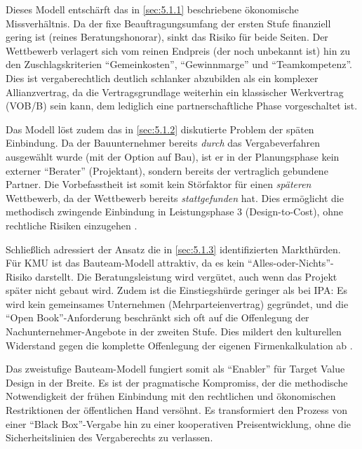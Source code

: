 Dieses Modell entschärft das in \cref{sec:5.1.1} beschriebene ökonomische Missverhältnis. Da der fixe Beauftragungsumfang der ersten Stufe finanziell gering ist (reines Beratungshonorar), sinkt das Risiko für beide Seiten. Der Wettbewerb verlagert sich vom reinen Endpreis (der noch unbekannt ist) hin zu den Zuschlagskriterien \enquote{Gemeinkosten}, \enquote{Gewinnmarge} und \enquote{Teamkompetenz}. Dies ist vergaberechtlich deutlich schlanker abzubilden als ein komplexer Allianzvertrag, da die Vertragsgrundlage weiterhin ein klassischer Werkvertrag (\acs{VOB}/B) sein kann, dem lediglich eine partnerschaftliche Phase vorgeschaltet ist.

Das Modell löst zudem das in \cref{sec:5.1.2} diskutierte Problem der späten Einbindung. Da der Bauunternehmer bereits \textit{durch} das Vergabeverfahren ausgewählt wurde (mit der Option auf Bau), ist er in der Planungsphase kein externer \enquote{Berater} (Projektant), sondern bereits der vertraglich gebundene Partner. Die Vorbefasstheit ist somit kein Störfaktor für einen \textit{späteren} Wettbewerb, da der Wettbewerb bereits \textit{stattgefunden} hat. Dies ermöglicht die methodisch zwingende Einbindung in Leistungsphase 3 (Design-to-Cost), ohne rechtliche Risiken einzugehen \autocite[Vgl.][]{greb_projektantenproblematik_2024}.

Schließlich adressiert der Ansatz die in \cref{sec:5.1.3} identifizierten Markthürden. Für \acs{KMU} ist das Bauteam-Modell attraktiv, da es kein \enquote{Alles-oder-Nichts}-Risiko darstellt. Die Beratungsleistung wird vergütet, auch wenn das Projekt später nicht gebaut wird. Zudem ist die Einstiegshürde geringer als bei \acs{IPA}: Es wird kein gemeinsames Unternehmen (Mehrparteienvertrag) gegründet, und die \enquote{Open Book}-Anforderung beschränkt sich oft auf die Offenlegung der Nachunternehmer-Angebote in der zweiten Stufe. Dies mildert den kulturellen Widerstand gegen die komplette Offenlegung der eigenen Firmenkalkulation ab \autocite[Vgl.][S.~10]{zdb_geschaftsbericht_2024}.

Das zweistufige Bauteam-Modell fungiert somit als \enquote{Enabler} für Target Value Design in der Breite. Es ist der pragmatische Kompromiss, der die methodische Notwendigkeit der frühen Einbindung mit den rechtlichen und ökonomischen Restriktionen der öffentlichen Hand versöhnt. Es transformiert den Prozess von einer \enquote{Black Box}-Vergabe hin zu einer kooperativen Preisentwicklung, ohne die Sicherheitslinien des Vergaberechts zu verlassen.

